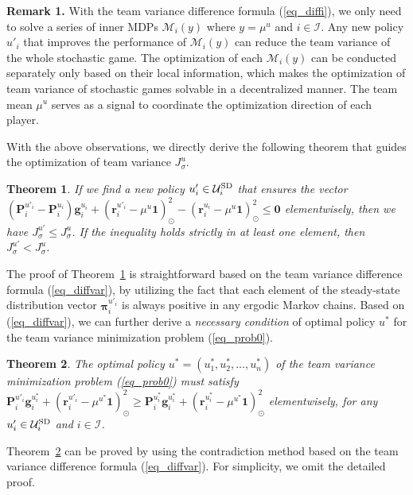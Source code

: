 \documentclass[12pt]{article}
\newtheorem{theorem}{Theorem}
\begin{document}
\noindent \textbf{Remark 1.} With the team variance difference
formula (\ref{eq_diffi}), we only need to solve a series of inner
MDPs $\mathcal M_i(y)$ where $y = \mu^u$ and $i \in \mathcal I$. Any
new policy $u'_i$ that improves the performance of $\mathcal M_i(y)$
can reduce the team variance of the whole stochastic game. The
optimization of each $\mathcal M_i(y)$ can be conducted separately
only based on their local information, which makes the optimization
of team variance of stochastic games solvable in a decentralized
manner. The team mean $\mu^u$ serves as a signal to coordinate the
optimization direction of each player.


With the above observations, we directly derive the following
theorem that guides the optimization of team variance
$J^u_{\sigma}$.

\begin{theorem}\label{theorem3}
If we find a new policy $u'_i \in \mathcal U^{\rm SD}_i$ that
ensures the vector $(\bm P^{u'_i}_i - \bm P^{u_i}_i)\bm g^{u_i}_i +
(\bm r^{u'_i}_i - \mu^u \bm 1)^2_{\odot} - (\bm r^{u_i}_i - \mu^u
\bm 1)^2_{\odot} \leq \bm 0$ elementwisely, then we have
$J^{u'}_{\sigma} \leq J^{u}_{\sigma}$. If the inequality holds
strictly in at least one element, then $J^{u'}_{\sigma} <
J^{u}_{\sigma}$.
\end{theorem}

The proof of Theorem~\ref{theorem3} is straightforward based on the
team variance difference formula (\ref{eq_diffvar}), by utilizing
the fact that each element of the steady-state distribution vector
$\bm \pi^{u'_i}_i$ is always positive in any ergodic Markov chains.
Based on (\ref{eq_diffvar}), we can further derive a \emph{necessary
condition} of optimal policy $u^*$ for the team variance
minimization problem (\ref{eq_prob0}).

\begin{theorem}\label{theorem4}
The optimal policy $u^*=(u^*_1,u^*_2,\dots,u^*_n)$ of the team
variance minimization problem (\ref{eq_prob0}) must satisfy $\bm
P^{u'_i}_i \bm g^{u^*_i}_i + (\bm r^{u'_i}_i - \mu^{u^*} \bm
1)^2_{\odot} \geq \bm P^{u^*_i}_i \bm g^{u^*_i}_i + (\bm r^{u^*_i}_i
- \mu^{u^*} \bm 1)^2_{\odot}$ elementwisely, for any $u'_i \in
\mathcal U^{\rm SD}_i$ and $i \in \mathcal I$.
\end{theorem}

Theorem~\ref{theorem4} can be proved by using the contradiction
method based on the team variance difference formula
(\ref{eq_diffvar}). For simplicity, we omit the detailed proof.
\end{document}
